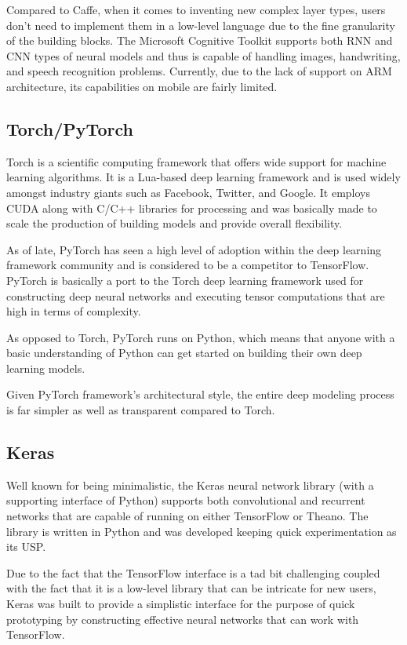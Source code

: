 Compared to Caffe, when it comes to inventing new complex layer types, users don't need to implement them in a low-level language due to the fine granularity of the building blocks. The Microsoft Cognitive Toolkit supports both RNN and CNN types of neural models and thus is capable of handling images, handwriting, and speech recognition problems. Currently, due to the lack of support on ARM architecture, its capabilities on mobile are fairly limited.


\subsection{Torch/PyTorch}
Torch is a scientific computing framework that offers wide support for machine learning algorithms. It is a Lua-based deep learning framework and is used widely amongst industry giants such as Facebook, Twitter, and Google. It employs CUDA along with C/C++ libraries for processing and was basically made to scale the production of building models and provide overall flexibility.

As of late, PyTorch has seen a high level of adoption within the deep learning framework community and is considered to be a competitor to TensorFlow. PyTorch is basically a port to the Torch deep learning framework used for constructing deep neural networks and executing tensor computations that are high in terms of complexity.

As opposed to Torch, PyTorch runs on Python, which means that anyone with a basic understanding of Python can get started on building their own deep learning models.

Given PyTorch framework's architectural style, the entire deep modeling process is far simpler as well as transparent compared to Torch.

\subsection{Keras}

Well known for being minimalistic, the Keras neural network library (with a supporting interface of Python) supports both convolutional and recurrent networks that are capable of running on either TensorFlow or Theano. The library is written in Python and was developed keeping quick experimentation as its USP.

Due to the fact that the TensorFlow interface is a tad bit challenging coupled with the fact that it is a low-level library that can be intricate for new users, Keras was built to provide a simplistic interface for the purpose of quick prototyping by constructing effective neural networks that can work with TensorFlow.

